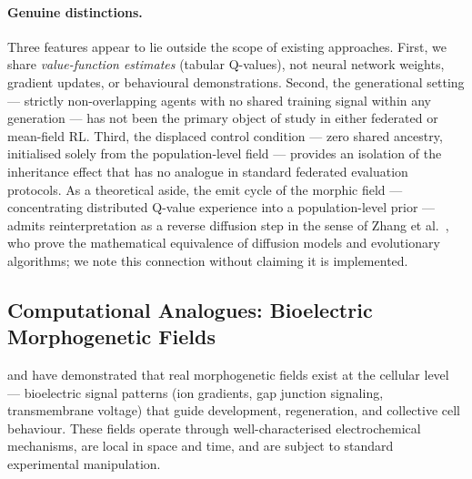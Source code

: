 \documentclass[twoside,11pt]{article}
\begin{document}
\paragraph{Genuine distinctions.}
Three features appear to lie outside the scope of existing approaches.
First, we share \emph{value-function estimates} (tabular Q-values), not
neural network weights, gradient updates, or behavioural demonstrations.
Second, the generational setting --- strictly non-overlapping agents with no
shared training signal within any generation --- has not been the primary
object of study in either federated or mean-field RL.  Third, the displaced
control condition --- zero shared ancestry, initialised solely from the
population-level field --- provides an isolation of the inheritance effect that
has no analogue in standard federated evaluation protocols.  As a theoretical
aside, the emit cycle of the morphic field --- concentrating distributed
Q-value experience into a population-level prior --- admits reinterpretation
as a reverse diffusion step in the sense of Zhang et al.~\citep{zhang2025diffusion},
who prove the mathematical equivalence of diffusion models and evolutionary
algorithms; we note this connection without claiming it is implemented.

\subsection{Computational Analogues: Bioelectric Morphogenetic Fields}
\label{sec:background:levin}

\citet{levin2025} and \citet{manicka2025} have demonstrated that real
morphogenetic fields exist at the cellular level --- bioelectric signal
patterns (ion gradients, gap junction signaling, transmembrane voltage) that
guide development, regeneration, and collective cell behaviour.  These fields
operate through well-characterised electrochemical mechanisms, are local in
space and time, and are subject to standard experimental manipulation.
\end{document}

